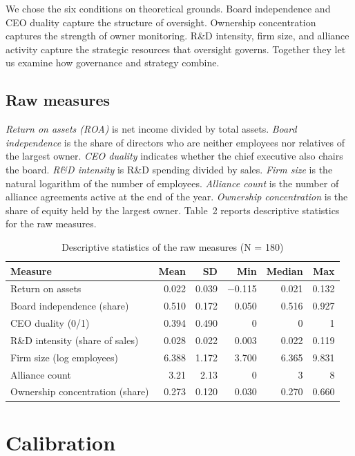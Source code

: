 \documentclass[11pt]{article}
\begin{document}
We chose the six conditions on theoretical grounds. Board independence and CEO duality capture the structure of oversight. Ownership concentration captures the strength of owner monitoring. R\&D intensity, firm size, and alliance activity capture the strategic resources that oversight governs. Together they let us examine how governance and strategy combine.

\subsection{Raw measures}

\emph{Return on assets (ROA)} is net income divided by total assets. \emph{Board independence} is the share of directors who are neither employees nor relatives of the largest owner. \emph{CEO duality} indicates whether the chief executive also chairs the board. \emph{R\&D intensity} is R\&D spending divided by sales. \emph{Firm size} is the natural logarithm of the number of employees. \emph{Alliance count} is the number of alliance agreements active at the end of the year. \emph{Ownership concentration} is the share of equity held by the largest owner. Table~2 reports descriptive statistics for the raw measures.

\clearpage
\setcounter{table}{1}
\begin{table}[t]
\centering
\caption{Descriptive statistics of the raw measures (N = 180)}
\begin{tabular}{lrrrrr}
\toprule
Measure & Mean & SD & Min & Median & Max \\
\midrule
Return on assets & 0.022 & 0.039 & $-$0.115 & 0.021 & 0.132 \\
Board independence (share) & 0.510 & 0.172 & 0.050 & 0.516 & 0.927 \\
CEO duality (0/1) & 0.394 & 0.490 & 0 & 0 & 1 \\
R\&D intensity (share of sales) & 0.028 & 0.022 & 0.003 & 0.022 & 0.119 \\
Firm size (log employees) & 6.388 & 1.172 & 3.700 & 6.365 & 9.831 \\
Alliance count & 3.21 & 2.13 & 0 & 3 & 8 \\
Ownership concentration (share) & 0.273 & 0.120 & 0.030 & 0.270 & 0.660 \\
\bottomrule
\end{tabular}
\end{table}

\section{Calibration}
\end{document}
